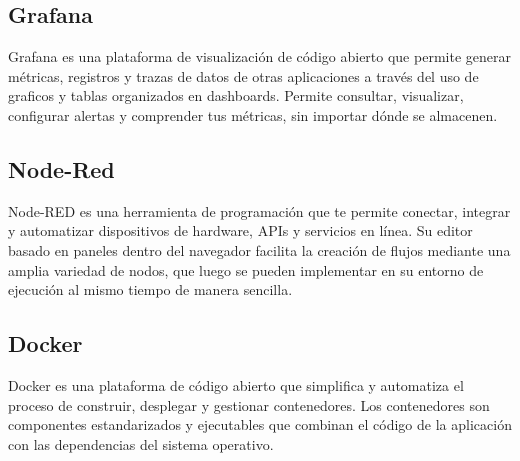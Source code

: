 \subsection{Grafana}
Grafana es una plataforma de visualización de código abierto que permite generar métricas, registros y trazas de datos de otras aplicaciones a través del uso de graficos y tablas organizados en dashboards. Permite consultar, visualizar, configurar alertas y comprender tus métricas, sin importar dónde se almacenen. 

\subsection{Node-Red}
Node-RED es una herramienta de programación que te permite conectar, integrar y automatizar dispositivos de hardware, APIs y servicios en línea. Su editor basado en paneles dentro del navegador facilita la creación de flujos mediante una amplia variedad de nodos, que luego se pueden implementar en su entorno de ejecución al mismo tiempo de manera sencilla.

\subsection{Docker}
Docker es una plataforma de código abierto que simplifica y automatiza el proceso de construir, desplegar y gestionar contenedores. Los contenedores son componentes estandarizados y ejecutables que combinan el código de la aplicación con las dependencias del sistema operativo.

